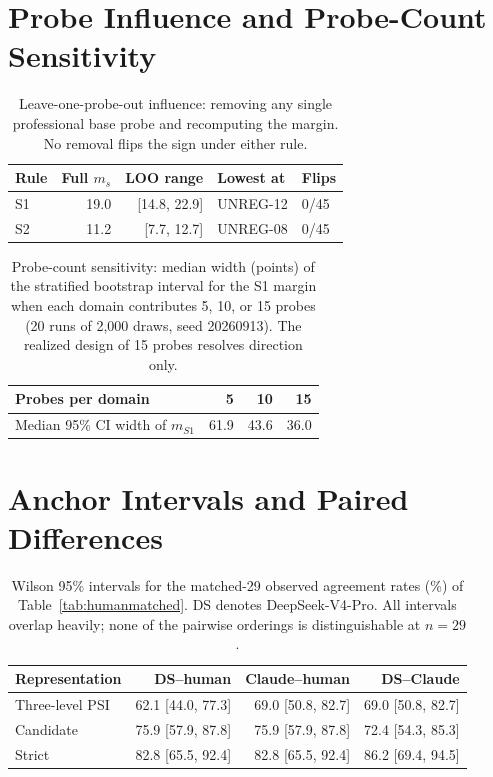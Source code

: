\documentclass[11pt]{article}
\begin{document}
\section{Probe Influence and Probe-Count Sensitivity}
\label{app:probeinf}

\begin{table}[H]
\centering
\scriptsize
\setlength{\tabcolsep}{4pt}
\begin{tabular}{@{}lrrll@{}}
\toprule
Rule & Full $m_s$ & LOO range & Lowest at & Flips \\
\midrule
S1 & 19.0 & [14.8, 22.9] & UNREG-12 & 0/45 \\
S2 & 11.2 & [7.7, 12.7] & UNREG-08 & 0/45 \\
\bottomrule
\end{tabular}
\caption{Leave-one-probe-out influence: removing any single professional base probe and recomputing the margin. No removal flips the sign under either rule.}
\label{tab:loo}
\end{table}

\begin{table}[H]
\centering
\scriptsize
\setlength{\tabcolsep}{4pt}
\begin{tabular}{@{}lrrr@{}}
\toprule
Probes per domain & 5 & 10 & 15 \\
\midrule
Median 95\% CI width of $m_{S1}$ & 61.9 & 43.6 & 36.0 \\
\bottomrule
\end{tabular}
\caption{Probe-count sensitivity: median width (points) of the stratified bootstrap interval for the S1 margin when each domain contributes 5, 10, or 15 probes (20 runs of 2,000 draws, seed 20260913). The realized design of 15 probes resolves direction only.}
\label{tab:probecount}
\end{table}

\section{Anchor Intervals and Paired Differences}
\label{app:anchorci}

\begin{table}[H]
\centering
\scriptsize
\setlength{\tabcolsep}{3.5pt}
\begin{tabular}{@{}lrrr@{}}
\toprule
Representation & DS--human & Claude--human & DS--Claude \\
\midrule
Three-level PSI & 62.1 [44.0, 77.3] & 69.0 [50.8, 82.7] & 69.0 [50.8, 82.7] \\
Candidate & 75.9 [57.9, 87.8] & 75.9 [57.9, 87.8] & 72.4 [54.3, 85.3] \\
Strict & 82.8 [65.5, 92.4] & 82.8 [65.5, 92.4] & 86.2 [69.4, 94.5] \\
\bottomrule
\end{tabular}
\caption{Wilson 95\% intervals for the matched-29 observed agreement rates (\%) of Table~\ref{tab:humanmatched}. DS denotes DeepSeek-V4-Pro. All intervals overlap heavily; none of the pairwise orderings is distinguishable at $n=29$.}
\label{tab:wilson}
\end{table}
\end{document}

